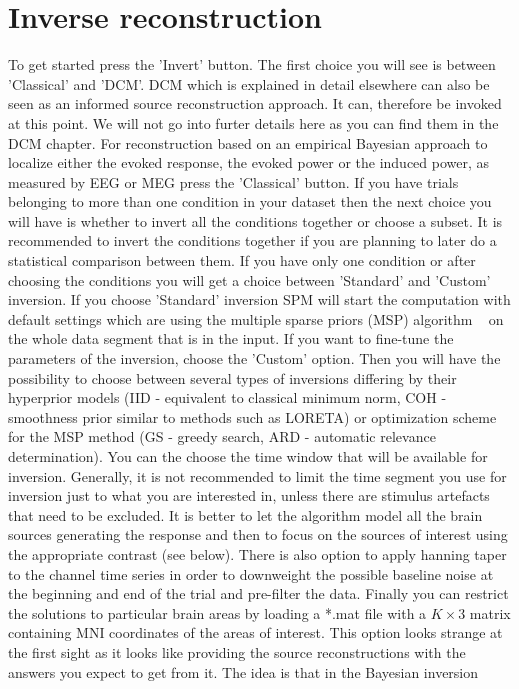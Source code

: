 \section{Inverse reconstruction}
To get started press the 'Invert' button. The first
choice you will see is between 'Classical' and 'DCM'. DCM which is explained in detail elsewhere can also be seen as an 
informed source reconstruction approach. It can, therefore be invoked at this point. We will not go into furter details here as you
can find them in the DCM chapter. For reconstruction based on an empirical Bayesian approach to localize either the evoked response, 
the evoked power or the induced power, as measured by EEG or MEG press the 'Classical' button. If you have trials belonging to more than one condition
in your dataset then the next choice you will have is whether to invert all the conditions together or choose a subset. It is recommended to invert
the conditions together if you are planning to later do a statistical comparison between them. If you have only one condition or after choosing
the conditions you will get a choice between 'Standard' and 'Custom' inversion. If you choose 'Standard' inversion SPM will start the computation
with default settings which are using the multiple sparse priors (MSP) algorithm ~\cite{karl_msp} on the whole data segment that is in the input.
If you want to fine-tune the parameters of the inversion, choose the 'Custom' option.
Then you will have the possibility to choose between several types of inversions differing by their hyperprior models (IID - equivalent to classical
minimum norm, COH - smoothness prior similar to methods such as LORETA) or optimization scheme for the MSP method (GS - greedy search, ARD - automatic
relevance determination). You can the choose the time window that will be available for inversion. Generally, it is not recommended to limit the time segment you use for inversion just to what you are interested in, unless there are stimulus artefacts
that need to be excluded. It is better to let the algorithm model all the brain sources generating the response and then to focus on the sources
of interest using the appropriate contrast (see below). There is also option to apply hanning taper to the channel time series in order to downweight
the possible baseline noise at the beginning and end of the trial and pre-filter the data. Finally you can restrict the solutions to particular
brain areas by loading a *.mat file with a $K \times 3$ matrix containing MNI coordinates of the areas of interest. This option looks strange at the first
sight as it looks like providing the source reconstructions with the answers you expect to get from it. The idea is that in the Bayesian inversion
